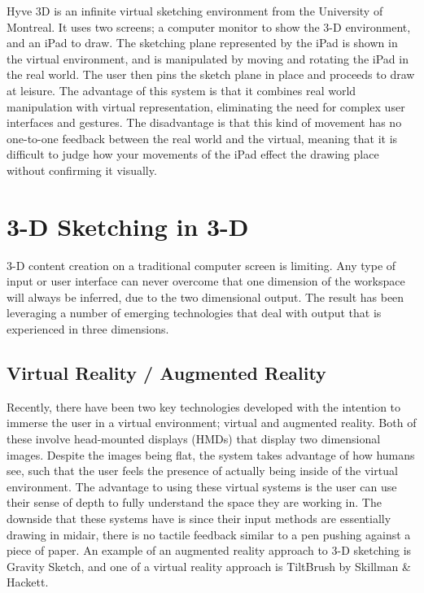 \documentclass[11pt]{report}
\begin{document}
Hyve 3D is an infinite virtual sketching environment from the University of Montreal. It uses two screens; a computer monitor to show the 3-D environment, and an iPad to draw. The sketching plane represented by the iPad is shown in the virtual environment, and is manipulated by moving and rotating the iPad in the real world. The user then pins the sketch plane in place and proceeds to draw at leisure. The advantage of this system is that it combines real world manipulation with virtual representation, eliminating the need for complex user interfaces and gestures. The disadvantage is that this kind of movement has no one-to-one feedback between the real world and the virtual, meaning that it is difficult to judge how your movements of the iPad effect the drawing place without confirming it visually.



\section{3-D Sketching in 3-D}

3-D content creation on a traditional computer screen is limiting. 
Any type of input or user interface can never overcome that one dimension of the workspace will always be inferred, due to the two dimensional output.
The result has been leveraging a number of emerging technologies that deal with output that is experienced in three dimensions. 


\subsection{Virtual Reality / Augmented Reality}

Recently, there have been two key technologies developed with the intention to immerse the user in a virtual environment; virtual and augmented reality. 
Both of these involve head-mounted displays (HMDs) that display two dimensional images.
Despite the images being flat, the system takes advantage of how humans see, such that the user feels the presence of actually being inside of the virtual environment.
The advantage to using these virtual systems is the user can use their sense of depth to fully understand the space they are working in.
The downside that these systems have is since their input methods are essentially drawing in midair, there is no tactile feedback similar to a pen pushing against a piece of paper.
An example of an augmented reality approach to 3-D sketching is Gravity Sketch, and one of a virtual reality approach is TiltBrush  by Skillman \& Hackett.
\end{document}
